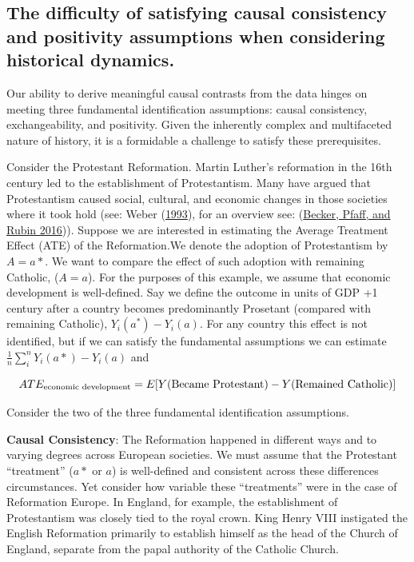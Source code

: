 \documentclass[
  singlecolumn]{report}
\begin{document}
\hypertarget{the-difficulty-of-satisfying-causal-consistency-and-positivity-assumptions-when-considering-historical-dynamics.}{%
\subsection{The difficulty of satisfying causal consistency and
positivity assumptions when considering historical
dynamics.}\label{the-difficulty-of-satisfying-causal-consistency-and-positivity-assumptions-when-considering-historical-dynamics.}}

Our ability to derive meaningful causal contrasts from the data hinges
on meeting three fundamental identification assumptions: causal
consistency, exchangeability, and positivity. Given the inherently
complex and multifaceted nature of history, it is a formidable a
challenge to satisfy these prerequisites.

Consider the Protestant Reformation. Martin Luther's reformation in the
16th century led to the establishment of Protestantism. Many have argued
that Protestantism caused social, cultural, and economic changes in
those societies where it took hold (see: Weber
(\protect\hyperlink{ref-weber1993}{1993}), for an overview see:
(\protect\hyperlink{ref-becker2016}{Becker, Pfaff, and Rubin 2016})).
Suppose we are interested in estimating the Average Treatment Effect
(ATE) of the Reformation.We denote the adoption of Protestantism by
\(A = a*\). We want to compare the effect of such adoption with
remaining Catholic, (\(A = a\)). For the purposes of this example, we
assume that economic development is well-defined. Say we define the
outcome in units of GDP +1 century after a country becomes predominantly
Prosetant (compared with remaining Catholic), \(Y_i(a^*) - Y_i(a)\). For
any country this effect is not identified, but if we can satisfy the
fundamental assumptions we can estimate
\(\frac{1}{n} \sum_i^{n} Y_i(a*) - Y_i(a)\) and

\[ATE_{\textnormal{economic~development}} = E[Y(\textnormal{Became~Protestant}) - Y(\textnormal{Remained~Catholic})]\]

Consider the two of the three fundamental identification assumptions.

\textbf{Causal Consistency}: The Reformation happened in different ways
and to varying degrees across European societies. We must assume that
the Protestant ``treatment'' (\(a*\) or \(a\)) is well-defined and
consistent across these differences circumstances. Yet consider how
variable these ``treatments'' were in the case of Reformation Europe. In
England, for example, the establishment of Protestantism was closely
tied to the royal crown. King Henry VIII instigated the English
Reformation primarily to establish himself as the head of the Church of
England, separate from the papal authority of the Catholic Church.
\end{document}
